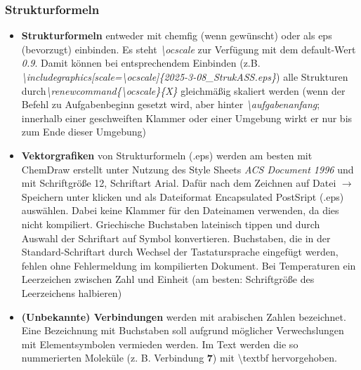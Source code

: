 \documentclass[../main.tex]{subfiles}
\begin{document}
\subsubsection{Strukturformeln}
\begin{itemize}
    \item \textbf{Strukturformeln} entweder mit chemfig (wenn gewünscht) oder als eps (bevorzugt) einbinden. Es steht \textit{\textbackslash ocscale} zur Verf\"ugung mit dem default-Wert \textit{0.9}. Damit k\"onnen bei entsprechendem Einbinden (z.B. \textit{\textbackslash includegraphics[scale=\textbackslash ocscale]\{2025-3-08\_StrukASS.eps\}}) alle Strukturen durch\linebreak \textit{\textbackslash renewcommand\{\textbackslash ocscale\}\{X\}} gleichm\"a\ss{}ig skaliert werden (wenn der Befehl zu Aufgabenbeginn gesetzt wird, aber hinter \textit{\textbackslash aufgabenanfang}; innerhalb einer geschweiften Klammer oder einer Umgebung wirkt er nur bis zum Ende dieser Umgebung)
    \item \textbf{Vektorgrafiken} von \hypertarget{Strukturformeln_eps}{}Strukturformeln (.eps) werden am besten mit ChemDraw erstellt unter Nutzung des Style Sheets \textit{ACS Document 1996} und mit Schriftgr\"o\ss{}e 12, Schriftart Arial. Dafür nach dem Zeichnen auf \glqq Datei\grqq{} $\rightarrow$ \glqq Speichern unter\grqq{} klicken und als Dateiformat  \glqq Encapsulated PostSript\grqq{} (.eps) auswählen. Dabei keine Klammer für den Dateinamen verwenden, da dies nicht kompiliert. Griechische Buchstaben lateinisch tippen und durch Auswahl der Schriftart auf \glqq Symbol\grqq{} konvertieren. Buchstaben, die in der Standard-Schriftart durch Wechsel der Tastatursprache eingef\"ugt werden, fehlen ohne Fehlermeldung im kompilierten Dokument. Bei Temperaturen ein Leerzeichen zwischen Zahl und Einheit (am besten: Schriftgr\"o\ss{}e des Leerzeichens halbieren)
    \item \textbf{(Unbekannte) Verbindungen} werden mit arabischen Zahlen bezeichnet. Eine Bezeichnung mit Buchstaben soll aufgrund möglicher Verwechslungen mit Elementsymbolen vermieden werden. Im Text werden die so nummerierten Moleküle (z. B. Verbindung \textbf{7}) mit \textbackslash textbf hervorgehoben.
\end{itemize}
\end{document}
